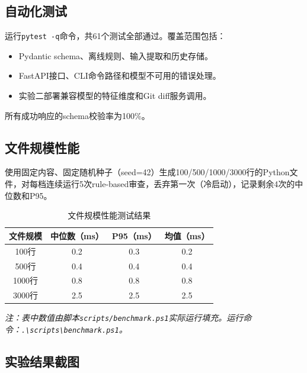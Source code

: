 \documentclass{experimentreport}
\begin{document}
\subsection{自动化测试}

运行\texttt{pytest -q}命令，共61个测试全部通过。覆盖范围包括：

\begin{itemize}
  \item Pydantic schema、离线规则、输入提取和历史存储。
  \item FastAPI接口、CLI命令路径和模型不可用的错误处理。
  \item 实验二部署兼容模型的特征维度和Git diff服务调用。
\end{itemize}

所有成功响应的schema校验率为100\%。

\subsection{文件规模性能}

使用固定内容、固定随机种子（seed=42）生成100/500/1000/3000行的Python文件，对每档连续运行5次rule-based审查，丢弃第一次（冷启动），记录剩余4次的中位数和P95。

\begin{table}[h]
\centering
\caption{文件规模性能测试结果}
\label{tab:perf}
\begin{tabular}{|c|c|c|c|}
\hline
\textbf{文件规模} & \textbf{中位数（ms）} & \textbf{P95（ms）} & \textbf{均值（ms）} \\
\hline
100行 & 0.2 & 0.3 & 0.2 \\
500行 & 0.4 & 0.4 & 0.4 \\
1000行 & 0.8 & 0.8 & 0.8 \\
3000行 & 2.5 & 2.5 & 2.5 \\
\hline
\end{tabular}
\end{table}

\textit{注：表中数值由脚本\texttt{scripts/benchmark.ps1}实际运行填充。运行命令：\texttt{.\textbackslash scripts\textbackslash benchmark.ps1}。}

\subsection{实验结果截图}
\end{document}
